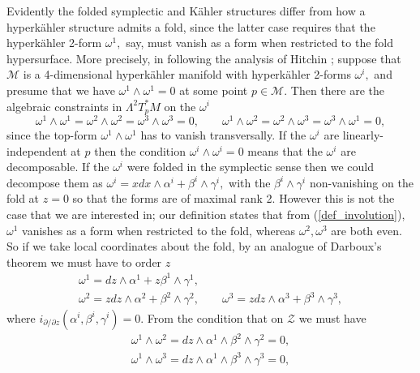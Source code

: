 \documentclass[a4paper,12pt, onecolumn, notitlepage]{article}
\theoremstyle{definition}
\theoremstyle{remark}
\newcommand{\al}{\alpha}
\newcommand{\w}{\omega}
\newcommand{\K}{K\"ahler }
\newcommand{\HK}{hyperk\"ahler }
\begin{document}
Evidently the folded symplectic and \K structures differ from how a \HK structure admits a fold, since the latter case requires that the \HK 2-form $\w^{1},$ say, must vanish as a form when restricted to the fold hypersurface. More precisely, in following the analysis of Hitchin \cite{hitchin_2015}; suppose that $\mathcal{M}$ is a 4-dimensional \HK manifold with \HK 2-forms $\w^{i},$ and presume that we have $\w^{1}\wedge\w^{1}=0$ at some point $p\in \mathcal{M}.$ Then there are the algebraic constraints in $\Lambda^{2}T_{p}^{\ast}M$ on the $\w^{i}$
\begin{equation*}
	\w^{1}\wedge\w^{1}=\w^{2}\wedge\w^{2}=\w^{3}\wedge\w^{3}=0, \qquad \w^{1}\wedge\w^{2}=\w^{2}\wedge\w^{3}=\w^{3}\wedge\w^{1}=0,
\end{equation*}
since the top-form $\w^{1}\wedge\w^{1}$ has to vanish transversally. If the $\w^{i}$ are linearly-independent at $p$ then the condition $\w^{i}\wedge\w^{i}=0$ means that the $\w^{i}$ are decomposable. If the $\w^{i}$ were folded in the symplectic sense then we could decompose them as $\w^{i} = xdx\wedge\al^{i} + \beta^{i}\wedge\gamma^{i},$ with the $\beta^{i}\wedge\gamma^{i}$ non-vanishing on the fold at $z=0$ so that the forms are of maximal rank 2. However this is not the case that we are interested in; our definition states that from (\ref{def_involution}), $\w^{1}$ vanishes as a form when restricted to the fold, whereas $\w^{2},\w^{3}$ are both even. So if we take local coordinates about the fold, by an analogue of Darboux's theorem we must have to order $z$
\begin{subequations}
	\begin{gather}
	\label{folded_kforms}
	\w^{1} = dz\wedge\al^{1} + z\beta^{1}\wedge\gamma^{1},\\\nonumber
	\w^{2} = zdz\wedge\al^{2} + \beta^{2}\wedge\gamma^{2},\qquad\w^{3} = zdz\wedge\al^{3} + \beta^{3}\wedge\gamma^{3},
	\end{gather}
\end{subequations}
where $i_{\partial/\partial z}(\al^{i},\beta^{i},\gamma^{i})=0.$ From the condition that on $\mathcal{Z}$ we must have
\begin{subequations}
	\begin{gather}
	\w^{1}\wedge\w^{2}=dz\wedge\al^{1}\wedge\beta^{2}\wedge\gamma^{2} = 0,\label{hk_vanishing1}\\
	\w^{1}\wedge\w^{3}=dz\wedge\al^{1}\wedge\beta^{3}\wedge\gamma^{3} = 0,\label{hk_vanishing2}
	\end{gather}
\end{subequations}
\end{document}
